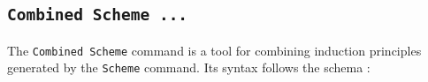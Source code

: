\subsection[\tt Combined Scheme ...]{\tt Combined Scheme ...\label{CombinedScheme}
\label{combinedscheme}}
The {\tt Combined Scheme} command is a tool for combining 
induction principles generated by the {\tt Scheme} command.
Its syntax follows the schema :


%

